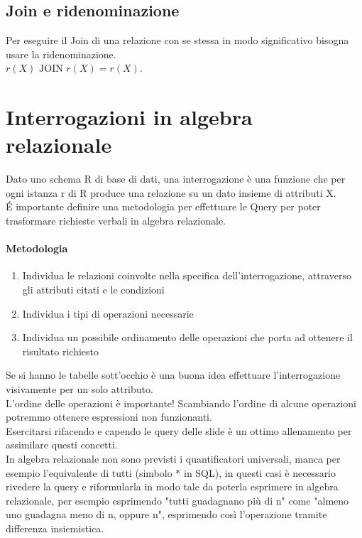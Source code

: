 \subsection*{Join e ridenominazione}
Per eseguire il Join di una relazione con se stessa in modo significativo bisogna usare la
ridenominazione.\\ $r(X) \,\, \text{JOIN} \,\,r(X) = r(X)$.\\

\section{Interrogazioni in algebra relazionale}
Dato uno schema R di base di dati, una interrogazione è una funzione che per ogni istanza r di R
produce una relazione su un dato insieme di attributi X.\\
\'E importante definire una metodologia per effettuare le Query per poter trasformare richieste verbali 
in algebra relazionale.
\paragraph*{Metodologia}
\begin{enumerate}
    \item Individua le relazioni coinvolte nella specifica dell'interrogazione, attraverso gli attributi citati e le
    condizioni
    \item Individua i tipi di operazioni necessarie
    \item Individua un possibile ordinamento delle operazioni che porta ad ottenere il risultato
    richiesto
\end{enumerate}
Se si hanno le tabelle sott'occhio è una buona idea effettuare l'interrogazione visivamente
per un solo attributo.\\
L'ordine delle operazioni è importante! Scambiando l'ordine di alcune operazioni potremmo ottenere
espressioni non funzionanti.\\
Esercitarsi rifacendo e capendo le query delle slide è un ottimo allenamento per assimilare
questi concetti.\\
In algebra relazionale non sono previsti i quantificatori universali, manca per esempio l'equivalente di
tutti (simbolo $*$ in SQL), in questi
casi è necessario rivedere la query e riformularla in modo tale da poterla esprimere in algebra relazionale, 
per esempio
esprimendo "tutti guadagnano più di n" come "almeno uno guadagna meno di n, oppure n", esprimendo
così l'operazione tramite differenza insiemistica.
